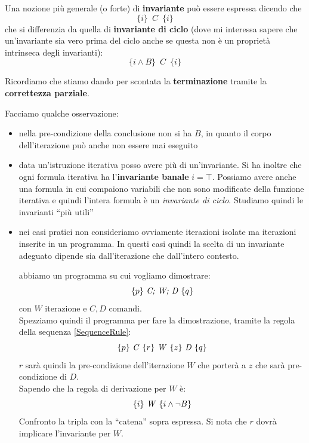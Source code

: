 			\begin{definizione}
				Una nozione più generale (o forte) di \textbf{invariante} può essere espressa dicendo che
				\[\{i\}\,\,\, C\,\,\,\{i\}\]
				che si differenzia da quella di \textbf{invariante di ciclo} (dove mi
				interessa sapere che un'invariante sia vero prima del ciclo anche se questa
				non è un proprietà intrinseca degli invarianti):
				\[\{i\land B\}\,\,\, C\,\,\,\{i\}\]
			\end{definizione} \vspace{5mm} %
			\begin{nota}
			Ricordiamo che stiamo dando per scontata la \textbf{terminazione} tramite la
			\textbf{correttezza parziale}.
			\end{nota}
			Facciamo qualche osservazione:
			\begin{itemize}
				\item nella pre-condizione della conclusione non si ha $B$, in quanto il
				      corpo dell'iterazione può anche non essere mai eseguito
				\item data un'istruzione iterativa posso avere più di un'invariante. Si ha
				      inoltre che ogni formula iterativa ha l'\textbf{invariante banale}
				      $i=\top$. Possiamo avere anche una formula in cui compaiono variabili che
				      non sono modificate della funzione iterativa e quindi l'intera formula è un
				      \textit{invariante di ciclo}. Studiamo quindi le invarianti ``più utili''
				\item nei casi pratici non consideriamo ovviamente iterazioni isolate ma
				      iterazioni inserite in un programma. In questi casi quindi la scelta di un
				      invariante adeguato dipende sia dall'iterazione che dall'intero contesto.
				      \begin{esempio}
				      	abbiamo un programma su cui vogliamo dimostrare:
				      	\[\{p\}\mbox{ \textit{C; W; D} }\{q\}\]
				      	con $W$ iterazione e $C, D$ comandi.\\
				      	Spezziamo quindi il programma per fare la dimostrazione, tramite la regola
				      	della sequenza \ref{SequenceRule}:
				      	\[\{p\}\mbox{ \textit{C} }\{r\}\mbox{ \textit{W} }\{z\}\mbox{ \textit{D}
				      			}\{q\}\]
				      		$r$ sarà quindi la pre-condizione dell'iterazione $W$ che porterà a $z$ che
				      		sarà pre-condizione di $D$.\\
				      		Sapendo che la regola di derivazione per $W$ è:
				      		\[\{i\}\mbox{ \textit{W} }\{i\land\neg B\}\]
				      		Confronto la tripla con la ``catena'' sopra espressa. Si nota che $r$
				      		dovrà implicare l'invariante per $W$.
				      		\end{esempio}
				      		\end{itemize}
